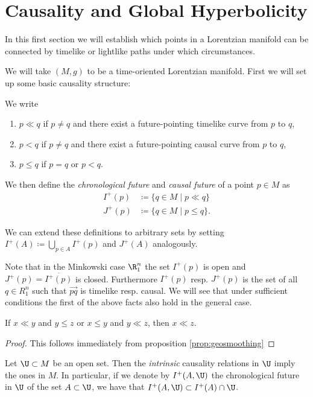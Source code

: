 
\section{Causality and Global Hyperbolicity}
In this first section we will establish which points in a Lorentzian manifold can be connected by timelike or lightlike paths under which circumstances. 

We will take $(M,g)$ to be a time-oriented Lorentzian manifold. First we will set up some basic causality structure:
\begin{definition}
We write
\begin{enumerate}
    \item $p\ll q$ if $p\neq q$ and there exist a future-pointing timelike curve from $p$ to $q$,
    \item $p<q$ if $p\neq q$ and there exist a future-pointing causal curve from $p$ to $q$,
    \item $p\leq q$ if $p=q$ or $p<q$.
\end{enumerate}
We then define the \emph{chronological future} and \emph{causal future} of a point $p\in M$ as
\begin{align*}
    I^+(p) &\coloneqq \{q\in M \mid p\ll q\}\\
    J^+(p) &\coloneqq \{q\in M \mid p\leq q\}.
\end{align*}

We can extend these definitions to arbitrary sets by setting $I^+(A)\coloneqq\bigcup_{p\in A}I^+(p)$ and $J^+(A)$ analogously.
\end{definition}

Note that in the Minkowski case $\R^n_1$ the set $I^+(p)$ is open and $J^+(p)=\overline{I^+(p)}$ is closed. Furthermore $I^+(p)$ resp. $J^+(p)$ is the set of all $q\in R^n_1$ such that $\overrightarrow{pq}$ is timelike resp. causal.
We will see that under sufficient conditions the first of the above facts also hold in the general case.

\begin{corollary}
If $x\ll y$ and $y\leq z$ or $x\leq y$ and $y\ll z$, then $x\ll z$.
\end{corollary}
\begin{proof}
This follows immediately from proposition \ref{prop:geosmoothing}
\end{proof}

Let $\U \subset M$ be an open set. Then the \emph{intrinsic} causality relations in $\U$ imply the ones in $M$. In particular, if we denote by $I^+(A,\U)$ the chronological future in $\U$ of the set $A\subset\U$, we have that $I^+(A,\U) \subset I^+(A)\cap \U$.

